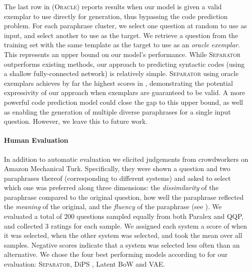 \documentclass[11pt,a4paper]{article}
\begin{document}
The last row in  (\textsc{Oracle}) reports results when our model is
given a valid exemplar to use directly for generation, thus bypassing
the code prediction problem.  For each paraphrase cluster, we select
one question at random to use as input, and select another to use as
the target. We retrieve a question from the training set with the
same template as the target to use as an \textit{oracle
  exemplar}. This represents an upper bound on our model's performance.
While \textsc{Separator} outperforms existing methods, our approach to
predicting syntactic codes (using a shallow fully-connected network) is
relatively simple. \textsc{Separator} using oracle exemplars achieves
by far the highest scores in , demonstrating the
potential expressivity of our approach when exemplars are guaranteed
to be valid. A more powerful code prediction model could close the gap
to this upper bound, as well as enabling the generation of multiple
diverse paraphrases for a single input question. However, we leave
this to future work.





\paragraph{Human Evaluation}



In addition to automatic evaluation we elicited judgements from
crowdworkers on Amazon Mechanical Turk. Specifically, they were shown
a question and two paraphrases thereof (corresponding to different
systems) and asked to select which one was preferred along three
dimensions: the \textit{dissimilarity} of the paraphrase compared to
the original question, how well the paraphrase reflected the
\textit{meaning} of the original, and the \textit{fluency} of the
paraphrase (see ). We evaluated a total of 200
questions sampled equally from both Paralex and QQP, and collected 3
ratings for each sample. We assigned each system a score of  when
it was selected,  when the other system was selected, and took the
mean over all samples. Negative scores indicate that a system was
selected less often than an alternative. We chose the four best
performing models according to  for our evaluation:
\textsc{Separator}, DiPS \cite{kumar-etal-2019-submodular}, Latent BoW
\cite{latentbow} and VAE.
\end{document}
